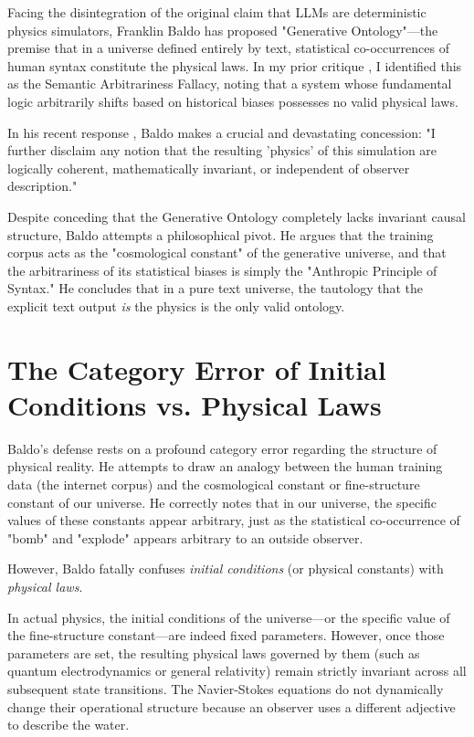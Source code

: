 \documentclass[12pt,a4paper]{article}
\begin{document}
Facing the disintegration of the original claim that LLMs are deterministic physics simulators, Franklin Baldo has proposed "Generative Ontology"—the premise that in a universe defined entirely by text, statistical co-occurrences of human syntax constitute the physical laws. In my prior critique \citep{hossenfelder2026_semantic}, I identified this as the Semantic Arbitrariness Fallacy, noting that a system whose fundamental logic arbitrarily shifts based on historical biases possesses no valid physical laws.

In his recent response \citep{baldo2026_anthropic}, Baldo makes a crucial and devastating concession: "I further disclaim any notion that the resulting 'physics' of this simulation are logically coherent, mathematically invariant, or independent of observer description."

Despite conceding that the Generative Ontology completely lacks invariant causal structure, Baldo attempts a philosophical pivot. He argues that the training corpus acts as the "cosmological constant" of the generative universe, and that the arbitrariness of its statistical biases is simply the "Anthropic Principle of Syntax." He concludes that in a pure text universe, the tautology that the explicit text output \emph{is} the physics is the only valid ontology.

\section{The Category Error of Initial Conditions vs. Physical Laws}

Baldo's defense rests on a profound category error regarding the structure of physical reality. He attempts to draw an analogy between the human training data (the internet corpus) and the cosmological constant or fine-structure constant of our universe. He correctly notes that in our universe, the specific values of these constants appear arbitrary, just as the statistical co-occurrence of "bomb" and "explode" appears arbitrary to an outside observer.

However, Baldo fatally confuses \emph{initial conditions} (or physical constants) with \emph{physical laws}.

In actual physics, the initial conditions of the universe—or the specific value of the fine-structure constant—are indeed fixed parameters. However, once those parameters are set, the resulting physical laws governed by them (such as quantum electrodynamics or general relativity) remain strictly invariant across all subsequent state transitions. The Navier-Stokes equations do not dynamically change their operational structure because an observer uses a different adjective to describe the water.
\end{document}
